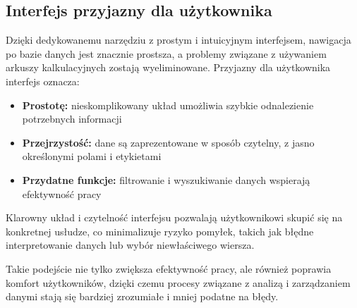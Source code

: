 \subsection{Interfejs przyjazny dla użytkownika}
\begin{comment}Dedykowane narzędzie z prostym i intuicyjnym interfejsem znacząco ułatwia nawigację po bazie danych, eliminując problemy związane z tradycyjnymi rozwiązaniami, takimi jak arkusze kalkulacyjne. \end{comment}

Dzięki dedykowanemu narzędziu z prostym i intuicyjnym interfejsem, nawigacja po bazie danych jest znacznie prostsza, a problemy związane z używaniem arkuszy kalkulacyjnych zostają wyeliminowane. Przyjazny dla użytkownika interfejs oznacza:
\begin{itemize}
    \item \textbf{Prostotę:} nieskomplikowany układ umożliwia szybkie odnalezienie potrzebnych informacji
    \item \textbf{Przejrzystość:} dane są zaprezentowane w sposób czytelny, z jasno określonymi polami i etykietami
    \item \textbf{Przydatne funkcje:} filtrowanie i wyszukiwanie danych wspierają efektywność pracy
\end{itemize}
Klarowny układ i czytelność interfejsu pozwalają użytkownikowi skupić się na konkretnej usłudze, co minimalizuje ryzyko pomyłek, takich jak błędne interpretowanie danych lub wybór niewłaściwego wiersza.

Takie podejście nie tylko zwiększa efektywność pracy, ale również poprawia komfort użytkowników, dzięki czemu procesy związane z analizą i zarządzaniem danymi stają się bardziej zrozumiałe i mniej podatne na błędy.